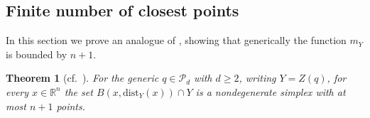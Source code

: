\documentclass{amsart}
\newcommand{\R}{\mathbb{R}}
\newcommand{\dd}{\mathrm{dist}}
\newcommand{\Poly}{\mathscr{P}}
\newtheorem{theorem}[subsubsection]{Theorem}
\theoremstyle{definition}
\theoremstyle{remark}
\begin{document}
%


\subsection{Finite number of closest points}In this section we prove an analogue of \cite[Proposition 3]{Yomdin1981}, showing that generically the function $m_Y$ is bounded by $n+1$. 

\begin{theorem}[cf.\ {\cite[Proposition 3]{Yomdin1981}}]
\label{T:Yomdin}
For the generic $q \in \Poly_d$ with $d\geq 2$, writing $Y = Z(q)$,  for every $x\in\R^n$ the set $B(x, \dd_Y(x)) \cap Y$ is a nondegenerate simplex with at most $n + 1$ points.\end{theorem}
\end{document}
